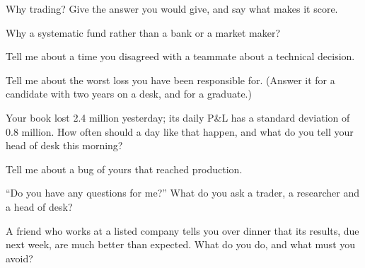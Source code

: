 \begin{interviewq}\label{iq:iv:behavioural-and-fit:1}
Why trading? Give the answer you would give, and say what makes it score.
\end{interviewq}

\begin{interviewq}\label{iq:iv:behavioural-and-fit:2}
Why a systematic fund rather than a bank or a market maker?
\end{interviewq}

\begin{interviewq}\label{iq:iv:behavioural-and-fit:3}
Tell me about a time you disagreed with a teammate about a technical decision.
\end{interviewq}

\begin{interviewq}\label{iq:iv:behavioural-and-fit:4}
Tell me about the worst loss you have been responsible for. (Answer it for a candidate with two years on a desk, and for a
graduate.)
\end{interviewq}

\begin{interviewq}\label{iq:iv:behavioural-and-fit:5}
Your book lost 2.4 million yesterday; its daily P\&L has a standard deviation of 0.8 million. How often should a day like that
happen, and what do you tell your head of desk this morning?
\end{interviewq}

\begin{interviewq}\label{iq:iv:behavioural-and-fit:6}
Tell me about a bug of yours that reached production.
\end{interviewq}

\begin{interviewq}\label{iq:iv:behavioural-and-fit:7}
``Do you have any questions for me?'' What do you ask a trader, a researcher and a head of desk?
\end{interviewq}

\begin{interviewq}\label{iq:iv:behavioural-and-fit:8}
A friend who works at a listed company tells you over dinner that its results, due next week, are much better than expected. What do
you do, and what must you avoid?
\end{interviewq}

